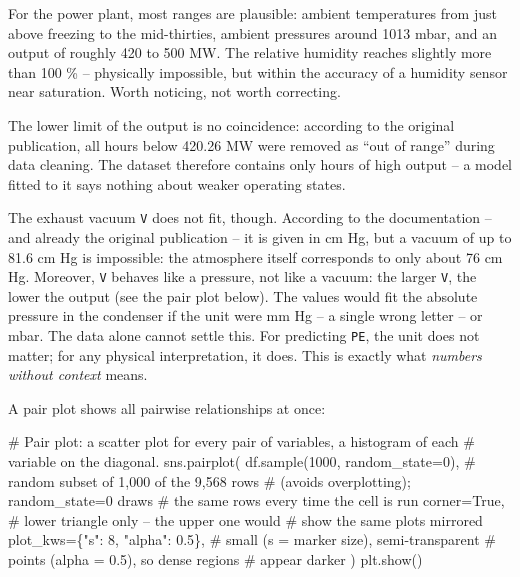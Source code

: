 \documentclass[
  letterpaper,
  DIV=11,
  numbers=noendperiod]{scrreprt}
\newenvironment{Shaded}{\begin{snugshade}}{\end{snugshade}}
\newcommand{\CommentTok}[1]{\textcolor[rgb]{0.37,0.37,0.37}{#1}}
\newcommand{\DecValTok}[1]{\textcolor[rgb]{0.68,0.00,0.00}{#1}}
\newcommand{\FloatTok}[1]{\textcolor[rgb]{0.68,0.00,0.00}{#1}}
\newcommand{\NormalTok}[1]{\textcolor[rgb]{0.00,0.23,0.31}{#1}}
\newcommand{\OperatorTok}[1]{\textcolor[rgb]{0.37,0.37,0.37}{#1}}
\newcommand{\StringTok}[1]{\textcolor[rgb]{0.13,0.47,0.30}{#1}}
\newcommand{\VariableTok}[1]{\textcolor[rgb]{0.07,0.07,0.07}{#1}}
\begin{document}
For the power plant, most ranges are plausible: ambient temperatures
from just above freezing to the mid-thirties, ambient pressures around
1013 mbar, and an output of roughly 420 to 500 MW. The relative humidity
reaches slightly more than 100 \% -- physically impossible, but within
the accuracy of a humidity sensor near saturation. Worth noticing, not
worth correcting.

The lower limit of the output is no coincidence: according to the
original publication, all hours below 420.26 MW were removed as ``out of
range'' during data cleaning. The dataset therefore contains only hours
of high output -- a model fitted to it says nothing about weaker
operating states.

The exhaust vacuum \texttt{V} does not fit, though. According to the
documentation -- and already the original publication -- it is given in
cm Hg, but a vacuum of up to 81.6 cm Hg is impossible: the atmosphere
itself corresponds to only about 76 cm Hg. Moreover, \texttt{V} behaves
like a pressure, not like a vacuum: the larger \texttt{V}, the lower the
output (see the pair plot below). The values would fit the absolute
pressure in the condenser if the unit were mm Hg -- a single wrong
letter -- or mbar. The data alone cannot settle this. For predicting
\texttt{PE}, the unit does not matter; for any physical interpretation,
it does. This is exactly what \emph{numbers without context} means.

A pair plot shows all pairwise relationships at once:

\begin{Shaded}
\begin{Highlighting}[]
\CommentTok{\# Pair plot: a scatter plot for every pair of variables, a histogram of each}
\CommentTok{\# variable on the diagonal.}
\NormalTok{sns.pairplot(}
\NormalTok{    df.sample(}\DecValTok{1000}\NormalTok{, random\_state}\OperatorTok{=}\DecValTok{0}\NormalTok{),   }\CommentTok{\# random subset of 1,000 of the 9,568 rows}
                                       \CommentTok{\# (avoids overplotting); random\_state=0 draws}
                                       \CommentTok{\# the same rows every time the cell is run}
\NormalTok{    corner}\OperatorTok{=}\VariableTok{True}\NormalTok{,                       }\CommentTok{\# lower triangle only – the upper one would}
                                       \CommentTok{\# show the same plots mirrored}
\NormalTok{    plot\_kws}\OperatorTok{=}\NormalTok{\{}\StringTok{"s"}\NormalTok{: }\DecValTok{8}\NormalTok{, }\StringTok{"alpha"}\NormalTok{: }\FloatTok{0.5}\NormalTok{\},   }\CommentTok{\# small (s = marker size), semi{-}transparent}
                                       \CommentTok{\# points (alpha = 0.5), so dense regions}
                                       \CommentTok{\# appear darker}
\NormalTok{)}
\NormalTok{plt.show()}
\end{Highlighting}
\end{Shaded}
\end{document}
